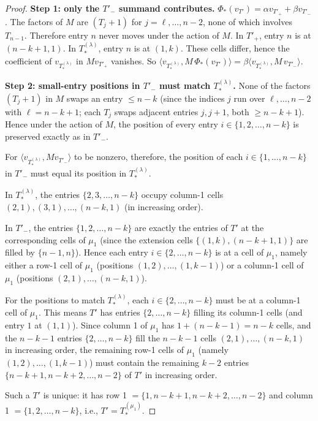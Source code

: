 \documentclass[11pt]{article}
\theoremstyle{definition}
\begin{document}
\begin{proof}
\textbf{Step 1: only the $T'_-$ summand contributes.}  $\Phi_*(v_{T'}) =
\alpha v_{T'_+} + \beta v_{T'_-}$.  The factors of $M$ are $(T_j{+}1)$
for $j = \ell, \ldots, n-2$, none of which involves $T_{n-1}$.  Therefore
entry $n$ never moves under the action of $M$.  In $T'_+$, entry $n$
is at $(n-k+1, 1)$.  In $T_{*}^{(\lambda)}$, entry $n$ is at $(1, k)$.
These cells differ, hence the coefficient of $v_{T_{*}^{(\lambda)}}$ in
$M v_{T'_+}$ vanishes.  So
$\langle v_{T_{*}^{(\lambda)}}, M\,\Phi_*(v_{T'})\rangle = \beta
\langle v_{T_{*}^{(\lambda)}}, M\,v_{T'_-}\rangle$.

\textbf{Step 2: small-entry positions in $T'_-$ must match
$T_{*}^{(\lambda)}$.}  None of the factors $(T_j{+}1)$ in $M$ swaps an
entry $\le n-k$ (since the indices $j$ run over $\ell, \ldots, n-2$ with
$\ell = n-k+1$; each $T_j$ swaps adjacent entries $j, j{+}1$, both
$\ge n-k+1$).  Hence under the action of $M$, the position of every
entry $i \in \{1, 2, \ldots, n-k\}$ is preserved exactly as in $T'_-$.

For $\langle v_{T_{*}^{(\lambda)}}, M v_{T'_-}\rangle$ to be nonzero,
therefore, the position of each $i \in \{1, \ldots, n-k\}$ in $T'_-$
must equal its position in $T_{*}^{(\lambda)}$.

In $T_{*}^{(\lambda)}$, the entries $\{2, 3, \ldots, n-k\}$ occupy
column-1 cells $(2, 1), (3, 1), \ldots, (n-k, 1)$ (in increasing order).

In $T'_-$, the entries $\{1, 2, \ldots, n-k\}$ are exactly the entries
of $T'$ at the corresponding cells of $\mu_1$ (since the extension cells
$\{(1, k), (n-k+1, 1)\}$ are filled by $\{n-1, n\}$).  Hence each entry
$i \in \{2, \ldots, n-k\}$ is at a cell of $\mu_1$, namely either a
row-1 cell of $\mu_1$ (positions $(1, 2), \ldots, (1, k-1)$) or a
column-1 cell of $\mu_1$ (positions $(2, 1), \ldots, (n-k, 1)$).

For the positions to match $T_{*}^{(\lambda)}$, each $i \in \{2, \ldots,
n-k\}$ must be at a column-1 cell of $\mu_1$.  This means $T'$ has
entries $\{2, \ldots, n-k\}$ filling its column-1 cells (and entry $1$
at $(1,1)$).  Since column 1 of $\mu_1$ has $1 + (n-k-1) = n-k$ cells,
and the $n-k-1$ entries $\{2, \ldots, n-k\}$ fill the $n-k-1$ cells
$(2, 1), \ldots, (n-k, 1)$ in increasing order, the remaining row-1 cells
of $\mu_1$ (namely $(1, 2), \ldots, (1, k-1)$) must contain the
remaining $k-2$ entries $\{n-k+1, n-k+2, \ldots, n-2\}$ of $T'$ in
increasing order.

Such a $T'$ is unique: it has row 1 $= \{1, n-k+1, n-k+2, \ldots, n-2\}$
and column 1 $= \{1, 2, \ldots, n-k\}$, i.e., $T' = T_{*}^{(\mu_1)}$.


\end{proof}
\end{document}
